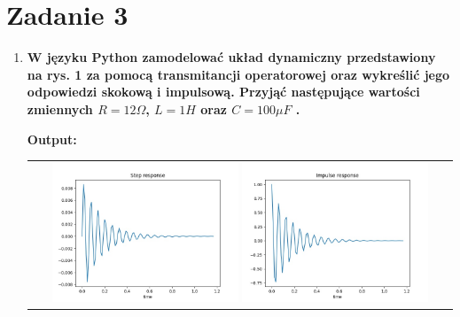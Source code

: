 \documentclass[12pt]{article}
\begin{document}
    \section{Zadanie 3}
        \begin{enumerate}
            \item\textbf{W języku Python zamodelować układ dynamiczny przedstawiony na rys. 1 za pomocą
            transmitancji operatorowej oraz wykreślić jego odpowiedzi skokową i impulsową.
            Przyjąć następujące wartości zmiennych $R = 12\Omega$, $L = 1H$ oraz $C = 100\mu F$ .}
                \begin{shbox}
                    \centering
                    \textbf{Output:} \\
                    \begin{tabular}{c}
                        \includegraphics[width=0.45\textwidth]{lab2/zad3_1step.jpg}
                        \includegraphics[width=0.45\textwidth]{lab2/zad3_1impulse.jpg}
                    \end{tabular}
                \end{shbox}


\end{enumerate}
\end{document}
